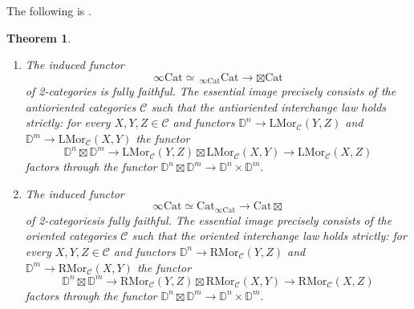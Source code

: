 \documentclass[10pt,oneside]{article}
\numberwithin{equation}{section} %
\numberwithin{figure}{section} %
\theoremstyle{plain}
\newtheorem{theorem}{Theorem}[subsection]
\theoremstyle{definition}
\newcommand{\bD}{{\mathbb D}}
\newcommand{\mA}{{\mathcal A}}
\newcommand{\mC}{{\mathcal C}}
\newcommand{\mD}{{\mathcal D}}
\renewcommand{\L}{{\mathrm L}}
\newcommand{\R}{{\mathrm R}}
\newcommand{\Cat}{\mathrm{Cat}}
\newcommand{\Fun}{\mathrm{Fun}}
\newcommand{\lax}{{\mathrm{lax}}}
\newcommand{\oplax}{{\mathrm{oplax}}}
\newcommand{\Mor}{{\mathrm{Mor}}}
\newcommand{\scat}{\mathcal{C}\mathit{at}}
\newcommand{\fcat}{\mathfrak{Cat}}
\begin{document}

The following is \cite[Theorem 4.2.7.]{oriented}.

\begin{theorem}\label{interchange}
\begin{enumerate}[\normalfont(1)]\setlength{\itemsep}{-2pt}
\item The induced functor $$ \infty\Cat\simeq\, _{\infty\Cat}\Cat \to {\boxtimes\Cat} $$ of 2-categories is fully faithful. The essential image precisely consists of the antioriented categories $\mC$ such that the antioriented interchange law holds strictly:
for every $X,Y,Z \in \mC$ and functors $\bD^n \to \L\Mor_\mC(Y,Z)$ and $\bD^m \to \L\Mor_\mC(X,Y)$
the functor $$\bD^n \boxtimes \bD^m \to \L\Mor_\mC(Y,Z) \boxtimes \L\Mor_\mC(X,Y) \to \L\Mor_\mC(X,Z)$$ factors through the functor
$\bD^n \boxtimes \bD^m \to \bD^n \times \bD^m.$ 
\item The induced functor $$\infty\Cat\simeq\Cat_{\infty\Cat} \to {\Cat\boxtimes} $$ of 2-categoriesis fully faithful. The essential image precisely consists of the oriented categories $\mC$ such that the oriented interchange law holds strictly:
for every $X,Y,Z \in \mC$ and functors $\bD^n \to \R\Mor_\mC(Y,Z)$ and $\bD^m \to \R\Mor_\mC(X,Y)$
the functor $$\bD^n \boxtimes \bD^m \to \R\Mor_\mC(Y,Z) \boxtimes \R\Mor_\mC(X,Y) \to \R\Mor_\mC(X,Z)$$ factors through the functor
$\bD^n \boxtimes \bD^m \to \bD^n \times \bD^m.$ 

\end{enumerate}   
\end{theorem}


\newpage
\end{document}
